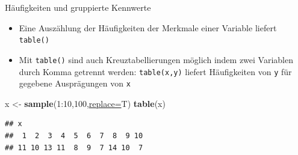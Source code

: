 \documentclass[
  ignorenonframetext,
]{beamer}
\newenvironment{Shaded}{\begin{snugshade}}{\end{snugshade}}
\newcommand{\DataTypeTok}[1]{\textcolor[rgb]{0.74,0.68,0.62}{\underline{#1}}}
\newcommand{\DecValTok}[1]{\textcolor[rgb]{0.27,0.67,0.26}{#1}}
\newcommand{\KeywordTok}[1]{\textcolor[rgb]{0.26,0.66,0.93}{\textbf{#1}}}
\newcommand{\NormalTok}[1]{\textcolor[rgb]{0.74,0.68,0.62}{#1}}
\newcommand{\OperatorTok}[1]{\textcolor[rgb]{0.74,0.68,0.62}{#1}}
\newcommand{\StringTok}[1]{\textcolor[rgb]{0.02,0.61,0.04}{#1}}
\providecommand{\tightlist}{%
  \setlength{\itemsep}{0pt}\setlength{\parskip}{0pt}}
\begin{document}
\begin{frame}[fragile]{Häufigkeiten und gruppierte Kennwerte}
\protect\hypertarget{haufigkeiten-und-gruppierte-kennwerte}{}

\begin{itemize}
\tightlist
\item
  Eine Auszählung der Häufigkeiten der Merkmale einer Variable liefert
  \texttt{table()}
\item
  Mit \texttt{table()} sind auch Kreuztabellierungen möglich indem zwei
  Variablen durch Komma getrennt werden: \texttt{table(x,y)} liefert
  Häufigkeiten von \texttt{y} für gegebene Ausprägungen von \texttt{x}
\end{itemize}

\begin{Shaded}
\begin{Highlighting}[]
\NormalTok{x <-}\StringTok{ }\KeywordTok{sample}\NormalTok{(}\DecValTok{1}\OperatorTok{:}\DecValTok{10}\NormalTok{,}\DecValTok{100}\NormalTok{,}\DataTypeTok{replace=}\NormalTok{T)}
\KeywordTok{table}\NormalTok{(x)}
\end{Highlighting}
\end{Shaded}

\begin{verbatim}
## x
##  1  2  3  4  5  6  7  8  9 10 
## 11 10 13 11  8  9  7 14 10  7
\end{verbatim}

\end{frame}
\end{document}
